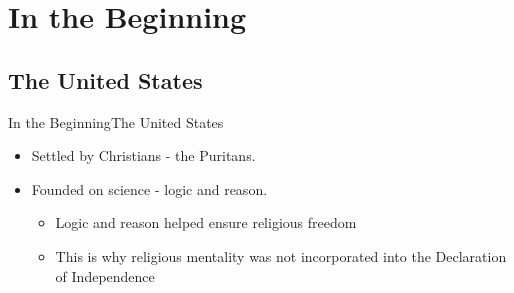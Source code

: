 \section{In the Beginning}
\subsection{The United States}
\begin{frame}{In the Beginning}{The United States}
	\begin{itemize}
		\item<1 -> Settled by Christians - the Puritans.
		\item<2 -> Founded on science - logic and reason.
			\begin{itemize}
				\item<3 -> Logic and reason helped ensure religious freedom
				\item<3 -> This is why religious mentality was not incorporated into the Declaration of Independence
			\end{itemize}
	\end{itemize}
\end{frame}

